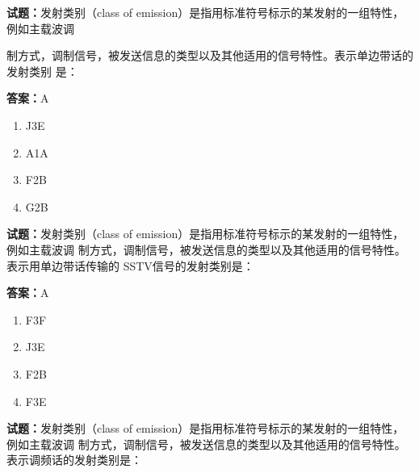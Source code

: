 \documentclass{ctexbook}
\begin{document}




\vspace{1em}

\textbf{试题：}发射类别（class of emission）是指用标准符号标示的某发射的一组特性，例如主载波调


制方式，调制信号，被发送信息的类型以及其他适用的信号特性。表示单边带话的发射类别
是： 

\textbf{答案：}A 

\begin{enumerate}[leftmargin=3em]
  \item J3E 

  \item A1A 

  \item F2B 

  \item G2B 

\end{enumerate}





\vspace{1em}

\textbf{试题：}发射类别（class of emission）是指用标准符号标示的某发射的一组特性，例如主载波调
制方式，调制信号，被发送信息的类型以及其他适用的信号特性。表示用单边带话传输的
SSTV信号的发射类别是： 

\textbf{答案：}A 

\begin{enumerate}[leftmargin=3em]
  \item F3F 

  \item J3E 

  \item F2B 

  \item F3E 

\end{enumerate}





\vspace{1em}

\textbf{试题：}发射类别（class of emission）是指用标准符号标示的某发射的一组特性，例如主载波调
制方式，调制信号，被发送信息的类型以及其他适用的信号特性。表示调频话的发射类别是： 
\end{document}
